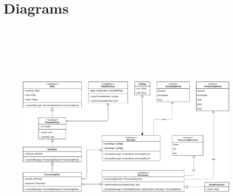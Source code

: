 \chapter{Diagrams}




\begin{figure}
    \centering
    \includegraphics[height=12cm]{img/ch05/classes-2-pipes.pdf}
    \label{fig:app-classes-2-pipes}
\end{figure}